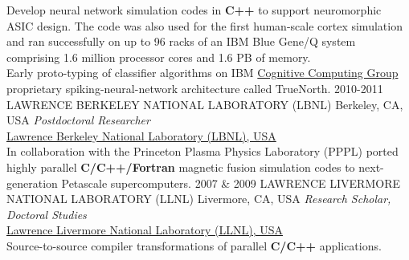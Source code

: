 \documentclass[]{friggeri-cv} %
\begin{document}
\begin{entrylist}
{%
{\color{blue}{\large{$\star$}}} Develop neural network simulation codes in \textbf{C++} to support neuromorphic ASIC design.
The code was also used for the first human-scale cortex simulation and ran successfully on
up to 96 racks of an IBM Blue Gene/Q system comprising 1.6 million processor
cores and 1.6 PB of memory.
\\
{\color{blue}{\large{$\star$}}} Early proto-typing of classifier algorithms on 
IBM {\href{http://www.ibm.com/smarterplanet/us/en/business_analytics/article/cognitive_computing.html}{Cognitive Computing Group}}
proprietary spiking-neural-network architecture called TrueNorth.}
\vspace{0.3em}
\entry
{2010-2011}
{LAWRENCE BERKELEY NATIONAL LABORATORY (LBNL)}
{Berkeley, CA, USA}
{\emph{Postdoctoral Researcher} \\
{\href{http://www.lbl.gov/}{Lawrence Berkeley National Laboratory (LBNL), USA}}{}{} \\
%
In collaboration with the Princeton Plasma Physics Laboratory (PPPL)
ported highly parallel \textbf{C/C++/Fortran} magnetic fusion simulation
codes to next-generation Petascale supercomputers.}
\vspace{0.3em}
\entry
{2007 \& 2009}
{LAWRENCE LIVERMORE NATIONAL LABORATORY (LLNL)}
{Livermore, CA, USA}
{\emph{Research Scholar, Doctoral Studies} \\
{\href{https://computation.llnl.gov/casc/}{Lawrence Livermore National Laboratory (LLNL), USA}}{}{} \\
Source-to-source compiler transformations of parallel \textbf{C/C++} applications.}
\vspace{0.3em}
\end{entrylist}
\end{document}
